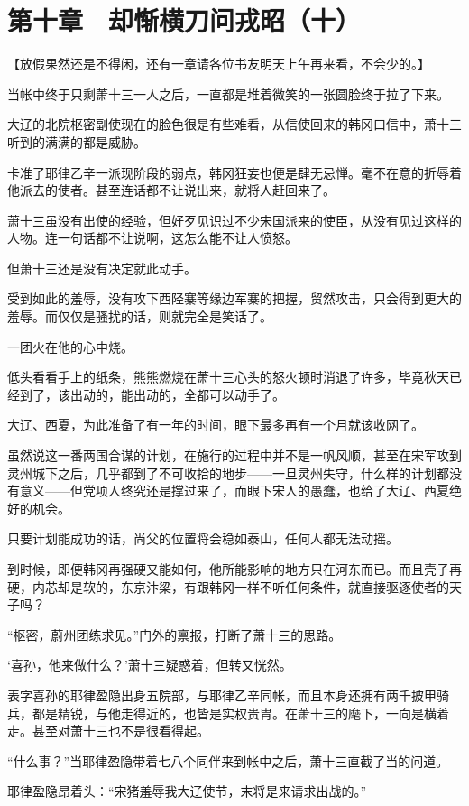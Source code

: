 \section{第十章　却惭横刀问戎昭（十）}

【放假果然还是不得闲，还有一章请各位书友明天上午再来看，不会少的。】

当帐中终于只剩萧十三一人之后，一直都是堆着微笑的一张圆脸终于拉了下来。

大辽的北院枢密副使现在的脸色很是有些难看，从信使回来的韩冈口信中，萧十三听到的满满的都是威胁。

卡准了耶律乙辛一派现阶段的弱点，韩冈狂妄也便是肆无忌惮。毫不在意的折辱着他派去的使者。甚至连话都不让说出来，就将人赶回来了。

萧十三虽没有出使的经验，但好歹见识过不少宋国派来的使臣，从没有见过这样的人物。连一句话都不让说啊，这怎么能不让人愤怒。

但萧十三还是没有决定就此动手。

受到如此的羞辱，没有攻下西陉寨等缘边军寨的把握，贸然攻击，只会得到更大的羞辱。而仅仅是骚扰的话，则就完全是笑话了。

一团火在他的心中烧。

低头看看手上的纸条，熊熊燃烧在萧十三心头的怒火顿时消退了许多，毕竟秋天已经到了，该出动的，能出动的，全都可以动手了。

大辽、西夏，为此准备了有一年的时间，眼下最多再有一个月就该收网了。

虽然说这一番两国合谋的计划，在施行的过程中并不是一帆风顺，甚至在宋军攻到灵州城下之后，几乎都到了不可收拾的地步——一旦灵州失守，什么样的计划都没有意义——但党项人终究还是撑过来了，而眼下宋人的愚蠢，也给了大辽、西夏绝好的机会。

只要计划能成功的话，尚父的位置将会稳如泰山，任何人都无法动摇。

到时候，即便韩冈再强硬又能如何，他所能影响的地方只在河东而已。而且壳子再硬，内芯却是软的，东京汴梁，有跟韩冈一样不听任何条件，就直接驱逐使者的天子吗？

“枢密，蔚州团练求见。”门外的禀报，打断了萧十三的思路。

‘喜孙，他来做什么？’萧十三疑惑着，但转又恍然。

表字喜孙的耶律盈隐出身五院部，与耶律乙辛同帐，而且本身还拥有两千披甲骑兵，都是精锐，与他走得近的，也皆是实权贵胄。在萧十三的麾下，一向是横着走。甚至对萧十三也不是很看得起。

“什么事？”当耶律盈隐带着七八个同伴来到帐中之后，萧十三直截了当的问道。

耶律盈隐昂着头：“宋猪羞辱我大辽使节，末将是来请求出战的。”

